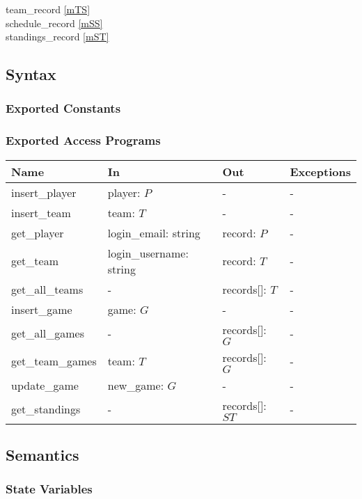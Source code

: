 \documentclass[12pt, titlepage]{article}
\begin{document}
team\_record \ref{mTS} \\
schedule\_record \ref{mSS} \\
standings\_record \ref{mST}

\subsection{Syntax}

\subsubsection{Exported Constants}

\subsubsection{Exported Access Programs}

\begin{center}
\begin{tabular}{p{4cm} p{4.5cm} p{2.5cm} p{2cm}}
\hline
\textbf{Name} & \textbf{In} & \textbf{Out} & \textbf{Exceptions} \\
\hline
insert\_player & player: $P$ & - & - \\
insert\_team & team: $T$ & - & - \\
get\_player & login\_email: string & record: $P$ & - \\
get\_team & login\_username: string & record: $T$ & - \\
get\_all\_teams & - & records[]: $T$ & - \\
insert\_game & game: $G$ & - & - \\
get\_all\_games & - & records[]: $G$ & - \\
get\_team\_games & team: $T$ & records[]: $G$ & - \\
update\_game & new\_game: $G$ & - & - \\
get\_standings & - & records[]: $ST$ & - \\
\hline
\end{tabular}
\end{center}

\subsection{Semantics}

\subsubsection{State Variables}
\end{document}
